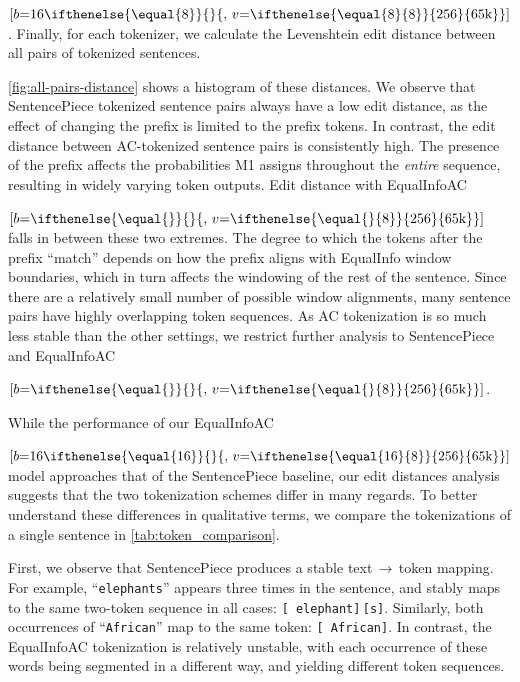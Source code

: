   {$[b\mathord{=}16\ifthenelse{\equal{8}}{}{,\,v\mathord{=}\ifthenelse{\equal{8}{8}}{256}{65\text{k}}}]$}. Finally, for each tokenizer, we calculate the Levenshtein edit distance \cite{Levenshtein1965BinaryCC} between all pairs of tokenized sentences.

\ref{fig:all-pairs-distance} shows a histogram of these distances. We observe that SentencePiece tokenized sentence pairs always have a low edit distance, as the effect of changing the prefix is limited to the prefix tokens. In contrast, the edit distance between AC\ifthenelse{\equal{}}{}{$[v\mathord{=}\ifthenelse{\equal{}{8}}{256}{65\text{k}}]$}-tokenized sentence pairs is consistently high. The presence of the prefix affects the probabilities M1 assigns throughout the \textit{entire} sequence, resulting in widely varying token outputs. Edit distance with EqualInfoAC
\ifthenelse{
    \equal{} \AND \equal{}
  }

  {$[b\mathord{=}\ifthenelse{\equal{}}{}{,\,v\mathord{=}\ifthenelse{\equal{}{8}}{256}{65\text{k}}}]$} falls in between these two extremes. The degree to which the tokens after the prefix ``match'' depends on how the prefix aligns with EqualInfo window boundaries, which in turn affects the windowing of the rest of the sentence. Since there are a relatively small number of possible window alignments, many sentence pairs have highly overlapping token sequences. As AC\ifthenelse{\equal{}}{}{$[v\mathord{=}\ifthenelse{\equal{}{8}}{256}{65\text{k}}]$} tokenization is so much less stable than the other settings, we restrict further analysis to SentencePiece and EqualInfoAC
\ifthenelse{
    \equal{} \AND \equal{}
  }

  {$[b\mathord{=}\ifthenelse{\equal{}}{}{,\,v\mathord{=}\ifthenelse{\equal{}{8}}{256}{65\text{k}}}]$}.

While the performance of our EqualInfoAC

  {$[b\mathord{=}16\ifthenelse{\equal{16}}{}{,\,v\mathord{=}\ifthenelse{\equal{16}{8}}{256}{65\text{k}}}]$} model approaches that of the SentencePiece baseline, our edit distances analysis suggests that the two tokenization schemes differ in many regards. To better understand these differences in qualitative terms, we compare the tokenizations of a single sentence in \ref{tab:token_comparison}.

First, we observe that SentencePiece produces a stable text\,$\rightarrow$\,token mapping. For example, ``\texttt{elephants}'' appears three times in the sentence, and stably maps to the same two-token sequence in all cases: \texttt{[~elephant]}\,\texttt{[s]}. Similarly, both occurrences of ``\texttt{African}'' map to the same token: \texttt{[~African]}. In contrast, the EqualInfoAC tokenization is relatively unstable, with each occurrence of these words being segmented in a different way, and yielding different token sequences.

